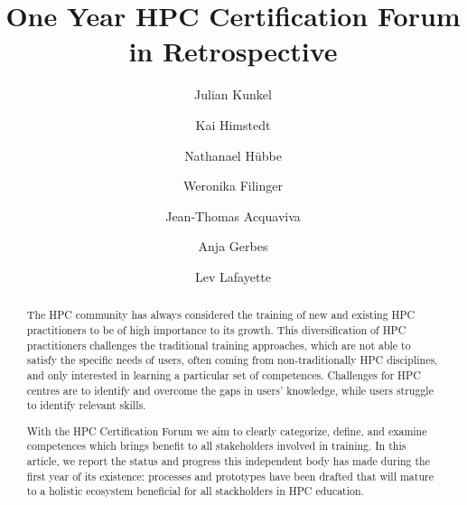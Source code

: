 \documentclass[jocse]{jocseart}
\begin{document}
\title{One Year HPC Certification Forum in Retrospective}

\author{Julian Kunkel}


\author{Kai Himstedt}
\author{Nathanael Hübbe}

\author{Weronika Filinger}

\author{Jean-Thomas Acquaviva}


\author{Anja Gerbes}

\author{Lev Lafayette}

\renewcommand{\shortauthors}{J. Kunkel et al.}


\begin{abstract}
  The HPC community has always considered the training of new and existing HPC practitioners to be of high importance to its growth.
  This diversification of HPC practitioners challenges the traditional training approaches, which are not able to satisfy the specific needs of users, often coming from non-traditionally HPC disciplines, and only interested in learning a particular set of competences.
  Challenges for HPC centres are to identify and overcome the gaps in users’ knowledge, while users struggle to identify relevant skills.

  With the HPC Certification Forum we aim to clearly categorize, define, and examine competences which brings benefit to all stakeholders involved in training.
  In this article, we report the status and progress this independent body has made during the first year of its existence: processes and prototypes have been drafted that will  mature to a holistic ecosystem beneficial for all stackholders in HPC education.
\end{abstract}

%
%
\begin{CCSXML}
\end{CCSXML}
\end{document}
